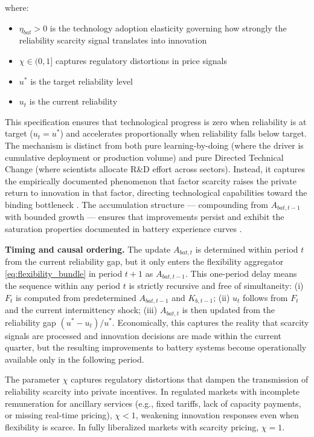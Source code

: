 \documentclass[12pt, a4paper]{article}
\begin{document}
where:
\begin{itemize}
    \item $\eta_{bat} > 0$ is the technology adoption elasticity governing how strongly the reliability scarcity signal translates into innovation
    \item $\chi \in (0,1]$ captures regulatory distortions in price signals
    \item $u^*$ is the target reliability level
    \item $u_t$ is the current reliability
\end{itemize}

This specification ensures that technological progress is zero when reliability is at target ($u_t = u^*$) and accelerates proportionally when reliability falls below target. The mechanism is distinct from both pure learning-by-doing (where the driver is cumulative deployment or production volume) and pure Directed Technical Change (where scientists allocate R\&D effort across sectors). Instead, it captures the empirically documented phenomenon that factor scarcity raises the private return to innovation in that factor, directing technological capabilities toward the binding bottleneck \citep{popp2002, acemoglu2012environment, aghion2016, hassler2021}. The accumulation structure --- compounding from $A_{bat,t-1}$ with bounded growth --- ensures that improvements persist and exhibit the saturation properties documented in battery experience curves \citep{kittner2017, way2022}.

\textbf{Timing and causal ordering.} The update $A_{bat,t}$ is determined within period $t$ from the current reliability gap, but it only enters the flexibility aggregator \eqref{eq:flexibility_bundle} in period $t+1$ as $A_{bat,t-1}$. This one-period delay means the sequence within any period $t$ is strictly recursive and free of simultaneity: (i) $F_t$ is computed from predetermined $A_{bat,t-1}$ and $K_{b,t-1}$; (ii) $u_t$ follows from $F_t$ and the current intermittency shock; (iii) $A_{bat,t}$ is then updated from the reliability gap $(u^* - u_t)/u^*$. Economically, this captures the reality that scarcity signals are processed and innovation decisions are made within the current quarter, but the resulting improvements to battery systems become operationally available only in the following period.

The parameter $\chi$ captures regulatory distortions that dampen the transmission of reliability scarcity into private incentives. In regulated markets with incomplete remuneration for ancillary services (e.g., fixed tariffs, lack of capacity payments, or missing real-time pricing), $\chi < 1$, weakening innovation responses even when flexibility is scarce. In fully liberalized markets with scarcity pricing, $\chi = 1$.
\end{document}
